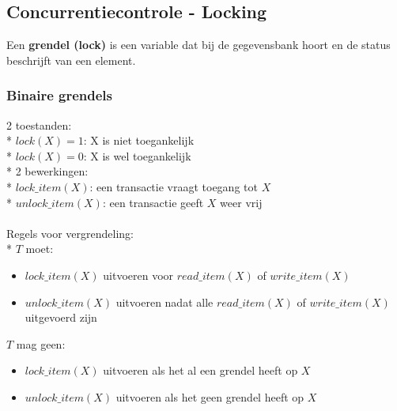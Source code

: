 \documentclass[10pt]{article}
\begin{document}
\subsection{Concurrentiecontrole - Locking}
Een \textbf{grendel (lock)} is een variable dat bij de gegevensbank hoort en de status beschrijft van een element.
\subsubsection{Binaire grendels}
2 toestanden:\\*
$lock(X) = 1$: X is niet toegankelijk\\*
$lock(X) = 0$: X is wel toegankelijk\\*
2 bewerkingen:\\*
$lock\_item(X)$: een transactie vraagt toegang tot $X$\\*
$unlock\_item(X)$: een transactie geeft $X$ weer vrij\\\\
Regels voor vergrendeling:\\*
$T$ moet:
\begin{itemize}
\item $lock\_item(X)$ uitvoeren voor $read\_item(X)$ of $write\_item(X)$
\item $unlock\_item(X)$ uitvoeren nadat alle $read\_item(X)$ of $write\_item(X)$ uitgevoerd zijn
\end{itemize}
$T$ mag geen:
\begin{itemize}
\item $lock\_item(X)$ uitvoeren als het al een grendel heeft op $X$
\item $unlock\_item(X)$ uitvoeren als het geen grendel heeft op $X$
\end{itemize}
\end{document}
